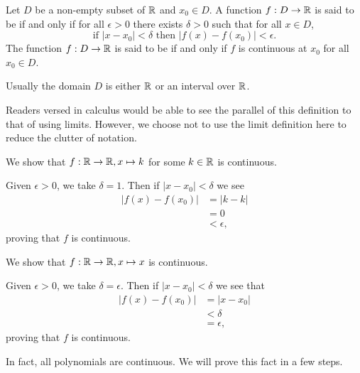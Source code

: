 \begin{definition}
    Let $D$ be a non-empty subset of $\mathbb{R}$ and $x_0 \in D$. A function $f: D \to \mathbb{R}$ is said to be  if and only if for all $\epsilon > 0$ there exists $\delta > 0$ such that for all $x \in D$,
    \[
        \text{if } |x - x_0| < \delta \text{ then } |f(x) - f(x_0)| < \epsilon.
    \]
    The function $f: D \to \mathbb{R}$ is said to be  if and only if $f$ is continuous at $x_0$ for all $x_0 \in D$.
\end{definition}
\begin{remark}
    Usually the domain $D$ is either $\mathbb{R}$ or an interval over $\mathbb{R}$.
\end{remark}

Readers versed in calculus would be able to see the parallel of this definition to that of using limits. However, we choose not to use the limit definition here to reduce the clutter of notation.

\begin{example}\label{example-constant-function-is-continuous}
    We show that $f: \mathbb{R} \to \mathbb{R}, x \mapsto k$ for some $k \in \mathbb{R}$ is continuous.

    Given $\epsilon > 0$, we take $\delta = 1$. Then if $|x - x_0| < \delta$ we see
    \begin{align*}
        |f(x) - f(x_0)| &= |k - k|\\
        &= 0\\
        &< \epsilon,
    \end{align*}
    proving that $f$ is continuous.
\end{example}

\begin{example}\label{example-identity-polynomial-is-continuous}
    We show that $f: \mathbb{R} \to \mathbb{R}, x \mapsto x$ is continuous.

    Given $\epsilon > 0$, we take $\delta = \epsilon$. Then if $|x - x_0| < \delta$ we see that
    \begin{align*}
        |f(x) - f(x_0)| &= |x - x_0|\\
        &< \delta\\
        &= \epsilon,
    \end{align*}
    proving that $f$ is continuous.
\end{example}

In fact, all polynomials are continuous. We will prove this fact in a few steps.

